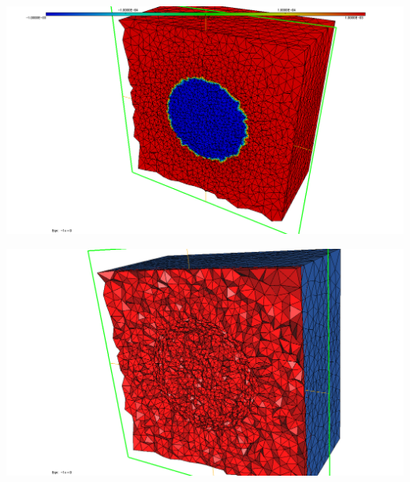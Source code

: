 \begingroup
	\begin{minipage}[t]{.5\linewidth}
		\centering
		\includegraphics[clip=true, trim=5cm 0 2cm 0, scale=.2]{Bordeaux/figures/3D/sphereDomLS.png}
	\end{minipage}
	\hfill
	\begin{minipage}[t]{.5\linewidth}
		\centering
		\includegraphics[clip=true, trim=5cm 0 5cm 0, scale=.2]{Bordeaux/figures/3D/sphereAdapt.png}
	\end{minipage}
\endgroup

\indent

\indent

